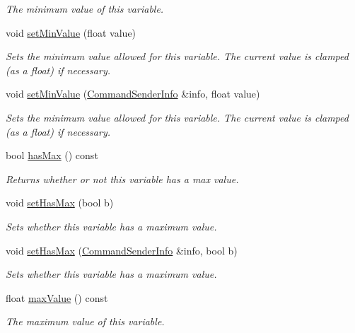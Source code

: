 \begin{DoxyCompactItemize}
\begin{DoxyCompactList}\small\item\em The minimum value of this variable. \end{DoxyCompactList}\item 
void \hyperlink{class_con_var_a9379b560e93785245e941f35df3c56e5}{set\-Min\-Value} (float value)
\begin{DoxyCompactList}\small\item\em Sets the minimum value allowed for this variable. The current value is clamped (as a float) if necessary. \end{DoxyCompactList}\item 
void \hyperlink{class_con_var_aa282144e7b6b81dc0ea94f0c4e78214e}{set\-Min\-Value} (\hyperlink{class_command_sender_info}{Command\-Sender\-Info} \&info, float value)
\begin{DoxyCompactList}\small\item\em Sets the minimum value allowed for this variable. The current value is clamped (as a float) if necessary. \end{DoxyCompactList}\item 
bool \hyperlink{class_con_var_a68f039f62cbff56805cfc446fae33afd}{has\-Max} () const 
\begin{DoxyCompactList}\small\item\em Returns whether or not this variable has a max value. \end{DoxyCompactList}\item 
void \hyperlink{class_con_var_a2bfda3901b996901e53c9a9197fd817d}{set\-Has\-Max} (bool b)
\begin{DoxyCompactList}\small\item\em Sets whether this variable has a maximum value. \end{DoxyCompactList}\item 
void \hyperlink{class_con_var_a5cdfdc995447dd20aabda54af6cfb37e}{set\-Has\-Max} (\hyperlink{class_command_sender_info}{Command\-Sender\-Info} \&info, bool b)
\begin{DoxyCompactList}\small\item\em Sets whether this variable has a maximum value. \end{DoxyCompactList}\item 
float \hyperlink{class_con_var_ab471739913a9e1a285d28d5f0523206a}{max\-Value} () const 
\begin{DoxyCompactList}\small\item\em The maximum value of this variable. \end{DoxyCompactList}\item 

\end{DoxyCompactItemize}
